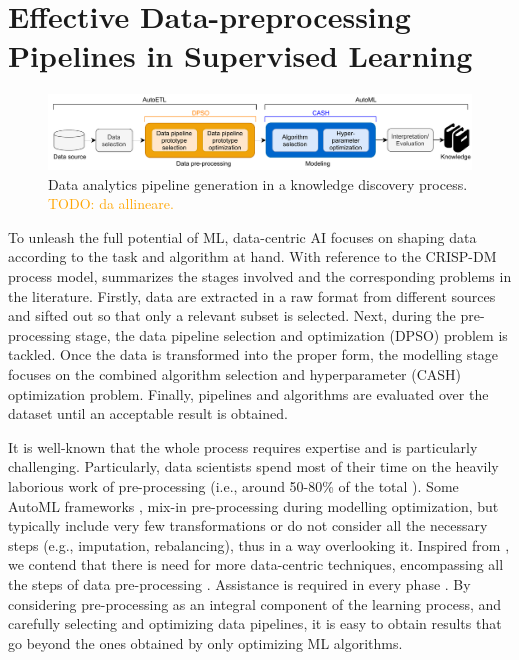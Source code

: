 
\chapter{Effective Data-preprocessing Pipelines in Supervised Learning}
\label{data-centric-chap:supervised}

\begin{figure}[t]
    \centering
    \includegraphics[width=1.0\textwidth]{chapters/data-centric/supervised/img/data-analytics-pipeline.pdf}
    \caption{Data analytics pipeline generation in a knowledge discovery process. \textcolor{orange}{TODO: da allineare.}}
    \label{effective-fig:data-analytics-pipeline}
\end{figure}

To unleash the full potential of ML, data-centric AI focuses on shaping data according to the task and algorithm at hand.
With reference to the CRISP-DM process model,   summarizes the stages involved and the corresponding problems in the literature.
Firstly, data are extracted in a raw format from different sources and sifted out so that only a relevant subset is selected.
Next, during the pre-processing stage, the data pipeline selection and optimization (DPSO) \cite{Quemy19DOLAP} problem is tackled.
Once the data is transformed into the proper form, the modelling stage focuses on the combined algorithm selection and hyperparameter (CASH) optimization problem.
Finally, pipelines and algorithms
are evaluated over the dataset until an acceptable result is obtained.

It is well-known that the whole process requires expertise and is particularly challenging.
Particularly, data scientists spend most of their time on the heavily laborious work of pre-processing (i.e., around 50-80\% of the total \cite{Munson09Pre}).
Some AutoML frameworks \cite{auto_sklearn, mohr2018ml}, mix-in pre-processing during modelling optimization, but typically include very few transformations or do not consider all the necessary steps (e.g., imputation, rebalancing), thus in a way overlooking it.
Inspired from \cite{Munoz09DOLAP}, we contend that there is need for more data-centric techniques, encompassing all the steps of data pre-processing \cite{Vaisman14Book}.
Assistance is required in every phase \cite{Bilalli16IOTBD}.
By considering pre-processing as an integral component of the learning process, and carefully selecting and optimizing data pipelines, it is easy to obtain results that go beyond the ones obtained by only optimizing ML algorithms.

